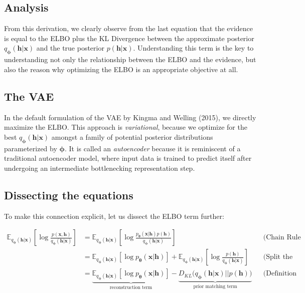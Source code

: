 \documentclass[%
oneside,                 %
final,                   %
10pt]{article}
\begin{document}
\subsection{Analysis}

From this derivation, we clearly observe from the last equation
that the evidence is equal to the ELBO plus the KL Divergence between
the approximate posterior $q_{\bm{\phi}}(\bm{h}|\bm{x})$ and the true
posterior $p(\bm{h}|\bm{x})$.  Understanding this term is the
key to understanding not only the relationship between the ELBO and
the evidence, but also the reason why optimizing the ELBO is an
appropriate objective at all.

\subsection{The VAE}

In the default formulation of the VAE by Kingma and Welling (2015), we directly maximize the ELBO.  This
approach is \textit{variational}, because we optimize for the best
$q_{\bm{\phi}}(\bm{h}|\bm{x})$ amongst a family of potential posterior
distributions parameterized by $\bm{\phi}$.  It is called an
\textit{autoencoder} because it is reminiscent of a traditional
autoencoder model, where input data is trained to predict itself after
undergoing an intermediate bottlenecking representation step.

\subsection{Dissecting the equations}
To make
this connection explicit, let us dissect the ELBO term further:

\begin{align*}
{\mathbb{E}_{q_{\bm{\phi}}(\bm{h}|\bm{x})}\left[\log\frac{p(\bm{x}, \bm{h})}{q_{\bm{\phi}}(\bm{h}|\bm{x})}\right]}
&= {\mathbb{E}_{q_{\bm{\phi}}(\bm{h}|\bm{x})}\left[\log\frac{p_{\bm{\theta}}(\bm{x}|\bm{h})p(\bm{h})}{q_{\bm{\phi}}(\bm{h}|\bm{x})}\right]}         && {\text{(Chain Rule of Probability)}}\\
&= {\mathbb{E}_{q_{\bm{\phi}}(\bm{h}|\bm{x})}\left[\log p_{\bm{\theta}}(\bm{x}|\bm{h})\right] + \mathbb{E}_{q_{\bm{\phi}}(\bm{h}|\bm{x})}\left[\log\frac{p(\bm{h})}{q_{\bm{\phi}}(\bm{h}|\bm{x})}\right]}         && {\text{(Split the Expectation)}}\\
&= \underbrace{{\mathbb{E}_{q_{\bm{\phi}}(\bm{h}|\bm{x})}\left[\log p_{\bm{\theta}}(\bm{x}|\bm{h})\right]}}_\text{reconstruction term} - \underbrace{{D_{KL}(q_{\bm{\phi}}(\bm{h}|\bm{x})}\vert\vert{p(\bm{h}))}}_\text{prior matching term} && {\text{(Definition of KL Divergence)}}
\end{align*}
\end{document}
